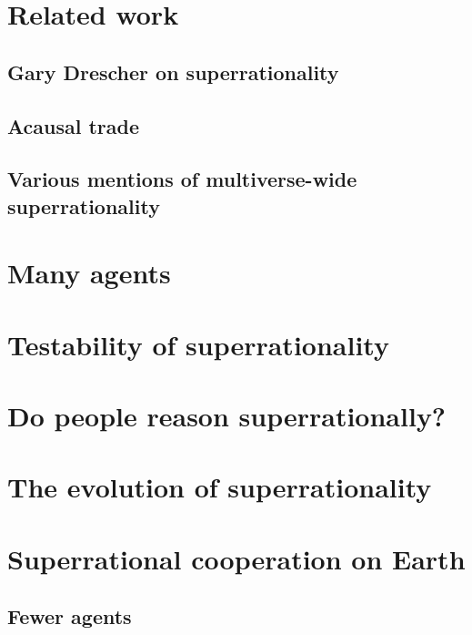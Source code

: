 \documentclass{book}
\begin{document}
\section{Related work}
\label{Related work}

\subsection{Gary Drescher on superrationality}
\label{Gary Drescher on superrationality}

\subsection{Acausal trade}
\label{Acausal trade}

\subsection{Various mentions of multiverse-wide superrationality}
\label{Various mentions of multiverse-wide superrationality}

\section{Many agents}
\label{Many agents}

\section{Testability of superrationality}
\label{Testability of superrationality}

\section{Do people reason superrationally?}
\label{Do people reason superrationally?}

\section{The evolution of superrationality}
\label{The evolution of superrationality}

\section{Superrational cooperation on Earth}
\label{Superrational cooperation on Earth}

\subsection{Fewer agents}
\label{Fewer agents}
\end{document}
